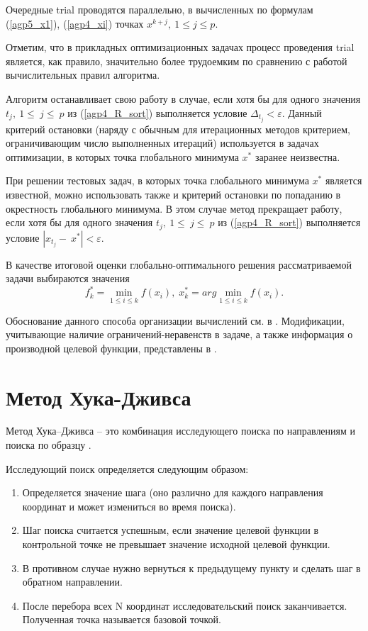 \documentclass{svproc}
\begin{document}
Очередные trial проводятся параллельно, в вычисленных по формулам (\ref{agp5_x1}), (\ref{agp4_xi}) точках $x^{k+j},\ 1\leq j\leq p$.

Отметим, что в прикладных оптимизационных задачах процесс проведения trial является, как правило, значительно более трудоемким по сравнению с работой вычислительных правил алгоритма.

Алгоритм останавливает свою работу в случае, если хотя бы для одного значения $t_j,\ 1\le\ j\le\ p$ из (\ref{agp4_R_sort}) выполняется условие \(\Delta_{t_j} < \varepsilon\). Данный критерий остановки (наряду с обычным для итерационных методов критерием, ограничивающим число выполненных итераций) используется в задачах оптимизации, в которых точка глобального минимума $x^*$ заранее неизвестна. 
	 
При решении тестовых задач, в которых точка глобального минимума $x^*$ является  известной, можно использовать также и критерий остановки по попаданию в окрестность глобального минимума. В этом случае метод прекращает работу, если хотя бы для одного значения $t_j,\ 1\le\ j\le\ p$ из (\ref{agp4_R_sort}) выполняется условие $\left|x_{t_j}-\ x^\ast\right| < \varepsilon.$
	
В качестве итоговой оценки глобально-оптимального решения рассматриваемой задачи выбираются значения 
\begin{equation}
f_k^*=\min_{1\leq i \leq k}f(x_i), \; x_k^*=arg \min_{1\leq i \leq k}f(x_i).
\end{equation}



Обоснование данного способа организации вычислений см. в \cite{fio_bib20}. Модификации, учитывающие наличие ограничений-неравенств в задаче, а также информация о производной целевой функции, представлены в \cite{fio_bib12, fio_bib9, fio_bib11}.


\section{Метод Хука-Дживса}

Метод Хука–Дживса – это комбинация исследующего поиска по направлениям и поиска по образцу \cite{fio_bib14, fio_bib15}.



Исследующий поиск определяется следующим образом: 
\begin{enumerate}
\item	Определяется значение шага (оно различно для каждого направления координат и может измениться во время поиска). 
\item	Шаг поиска считается успешным, если значение целевой функции в контрольной точке не превышает значение исходной целевой функции. 
\item	В противном случае нужно вернуться к предыдущему пункту и сделать шаг в обратном направлении. 
\item	После перебора всех N координат исследовательский поиск заканчивается. Полученная точка называется базовой точкой.
\end{enumerate}
\end{document}
